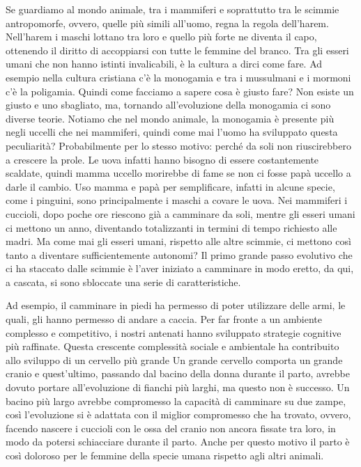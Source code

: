 \documentclass[12pt]{book} %
\begin{document}
Se guardiamo al mondo animale, tra i mammiferi e soprattutto tra le scimmie antropomorfe, ovvero, quelle più simili
all'uomo, regna la regola dell'harem. Nell'harem i
maschi lottano tra loro e quello più forte ne diventa il capo, ottenendo il diritto di accoppiarsi con tutte le femmine
del branco. Tra gli esseri umani che non hanno istinti invalicabili, è la cultura a dirci come fare. Ad
esempio nella cultura cristiana c'è la monogamia e tra i mussulmani e i mormoni c'è la poligamia. Quindi come facciamo a sapere
cosa è giusto fare? Non esiste un giusto e uno sbagliato, ma, tornando all'evoluzione
della monogamia ci sono diverse teorie. Notiamo che nel mondo animale, la monogamia è presente più negli uccelli che
nei mammiferi, quindi come mai l'uomo ha sviluppato questa peculiarità? Probabilmente per lo
stesso motivo: perché da soli non riuscirebbero a crescere la prole. Le uova infatti hanno bisogno di essere costantemente scaldate, quindi
mamma uccello morirebbe di fame se non ci fosse papà uccello a darle il cambio. Uso mamma e papà per semplificare,
infatti in alcune specie, come i pinguini, sono principalmente i maschi a covare le uova. Nei mammiferi i cuccioli,
dopo poche ore riescono già a camminare da soli, mentre gli esseri umani ci mettono un anno, diventando totalizzanti in
termini di tempo richiesto alle madri. Ma come mai gli esseri umani, rispetto alle altre scimmie, ci mettono così tanto
a diventare sufficientemente autonomi? Il primo grande passo evolutivo che ci ha staccato dalle scimmie è
l'aver iniziato a camminare in modo eretto, da qui, a cascata, si sono sbloccate una serie di
caratteristiche. 

Ad esempio, il camminare in piedi ha permesso di poter utilizzare delle armi, le quali, gli hanno permesso di andare a
caccia. Per far fronte a un ambiente complesso e competitivo, i nostri antenati hanno sviluppato strategie cognitive più raffinate. Questa crescente complessità sociale e ambientale ha contribuito allo sviluppo di un cervello più grande
Un grande cervello comporta un grande cranio e quest'ultimo,
passando dal bacino della donna durante il parto, avrebbe dovuto portare all'evoluzione di fianchi
più larghi, ma questo non è successo. Un bacino più largo avrebbe compromesso la capacità di camminare su due zampe,
così l'evoluzione si è adattata con il miglior compromesso che ha trovato, ovvero, facendo nascere
i cuccioli con le ossa del cranio non ancora fissate tra loro, in modo da potersi schiacciare durante il parto. Anche
per questo motivo il parto è così doloroso per le femmine della specie umana rispetto agli altri animali. 
\end{document}

